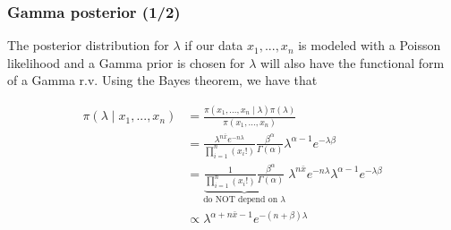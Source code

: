 \documentclass[border=5mm, convert, usenames, dvipsnames,beamer]{standalone}
\begin{document}
\begin{frame}
\frametitle{Gamma posterior (1/2)}

\vspace{40}
\noindent
The posterior distribution for $\lambda$ if our data $x_{1},...,x_{n}$ is modeled with a Poisson likelihood and a Gamma prior is chosen for $\lambda$ will also have the functional form of a Gamma r.v. Using the Bayes theorem, we have that

$$
\begin{align*} 
 \pi(\lambda \mid x_{1},...,x_{n}) & =  \frac{\pi( x_{1},...,x_{n} \mid \lambda) \pi( \lambda) }{\pi(x_{1},...,x_{n})} \\
&  =\frac{\lambda^{n \bar{x}}e^{- n \lambda}}{\prod_{i=1}^{n} ( x_{i}!)} \frac{  \beta^{\alpha}   }{ \Gamma(\alpha)  } \lambda^{\alpha - 1}   e^{- \lambda \beta } \\
 & = \underbrace{\frac{1}{\prod_{i=1}^{n} ( x_{i}!)}   \frac{  \beta^{\alpha}   }{ \Gamma(\alpha)  }}_{\text{do NOT depend on $\lambda$}} \  \lambda^{n \bar{x}} e^{-n \lambda} \lambda^{\alpha - 1} e^{-\lambda \beta }     \\
&  \propto   \lambda^{\alpha +n \bar{x} - 1} e^{-(n+\beta) \lambda} \\
\end{align*}
$$



\par
\end{frame}




\end{document}

